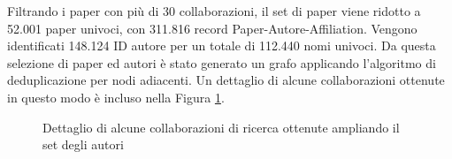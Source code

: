 \documentclass[12pt,a4paper,twoside]{report}
\begin{document}
Filtrando i paper con più di 30 collaborazioni, il set di paper viene ridotto a 52.001 paper
univoci, con 311.816 record Paper-Autore-Affiliation. Vengono identificati 148.124 ID autore per un
totale di 112.440 nomi univoci. Da questa selezione di paper ed autori è stato generato un grafo
applicando l'algoritmo di deduplicazione per nodi adiacenti. Un dettaglio di alcune collaborazioni
ottenute in questo modo è incluso nella Figura \ref{img:grupporicerca}.

\begin{figure}[ht]
    \vspace*{-3cm}
    \centering
    \setlength{\fboxrule}{0pt} %
    \caption{Dettaglio di alcune collaborazioni di ricerca ottenute ampliando il set degli autori}
    \label{img:grupporicerca}
\end{figure}
\end{document}
